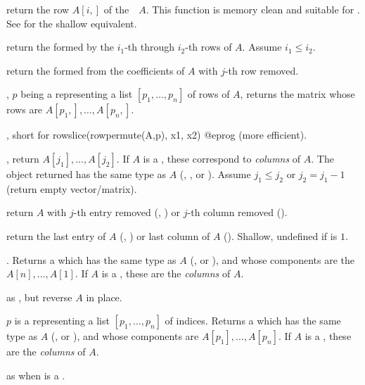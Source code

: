  return the row $A[i,]$ of
the~~$A$. This function is memory clean and suitable for
. See  for the shallow equivalent.

 return the 
formed by the $i_1$-th through $i_2$-th rows of  $A$. Assume $i_1
\leq i_2$.

 return the  formed from the
coefficients of  $A$ with $j$-th row removed.

, $p$ being a 
representing a list $[p_1,\dots,p_n]$ of rows of  $A$, returns the
matrix whose rows are $A[p_1,],\dots, A[p_n,]$.

, short for
\bprog
  rowslice(rowpermute(A,p), x1, x2)
@eprog\noindent
(more efficient).

, return $A[j_1], \dots,
A[j_2]$. If $A$ is a , these correspond to \emph{columns} of $A$.
The object returned has the same type as $A$ (, ,
 or ). Assume $j_1 \leq j_2$ or $j_2 = j_1 - 1$ (return
empty vector/matrix).

 return $A$ with $j$-th entry removed
(, ) or $j$-th column removed ().

 return the last entry of $A$
(, ) or last column of $A$ (). Shallow, undefined
if  is $1$.

. Returns a  which has the same
type as $A$ (,  or ), and whose components
are the $A[n],\dots,A[1]$. If $A$ is a , these are the
\emph{columns} of $A$.

 as , but reverse
$A$ in place.

 $p$ is a  representing
a list $[p_1,\dots,p_n]$ of indices. Returns a  which has the same
type as $A$ (,  or ), and whose components
are $A[p_1],\dots,A[p_n]$. If $A$ is a , these are the
\emph{columns} of $A$.

 as  when  is a
.

